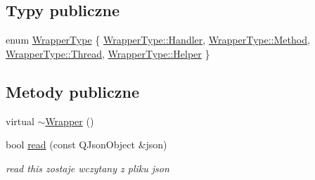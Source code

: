 \subsection*{Typy publiczne}
\begin{DoxyCompactItemize}
\item 
enum \hyperlink{class_d_adding_methods_1_1_wrapper_acb6db05ae66304ccd8b53c49221e0b09}{Wrapper\-Type} \{ \hyperlink{class_d_adding_methods_1_1_wrapper_acb6db05ae66304ccd8b53c49221e0b09a0bb4c52ba15ca41d65967d91840c66fb}{Wrapper\-Type\-::\-Handler}, 
\hyperlink{class_d_adding_methods_1_1_wrapper_acb6db05ae66304ccd8b53c49221e0b09a4c3880bb027f159e801041b1021e88e8}{Wrapper\-Type\-::\-Method}, 
\hyperlink{class_d_adding_methods_1_1_wrapper_acb6db05ae66304ccd8b53c49221e0b09ad97477d6d8a838ead9348185bb5b6742}{Wrapper\-Type\-::\-Thread}, 
\hyperlink{class_d_adding_methods_1_1_wrapper_acb6db05ae66304ccd8b53c49221e0b09aec34cd6f057c4737bfc8df7590ecb87e}{Wrapper\-Type\-::\-Helper}
 \}
\end{DoxyCompactItemize}
\subsection*{Metody publiczne}
\begin{DoxyCompactItemize}
\item 
virtual \hyperlink{class_d_adding_methods_1_1_wrapper_aa4f7725137a5389ee76db0bd8590243e}{$\sim$\-Wrapper} ()
\item 
bool \hyperlink{class_d_adding_methods_1_1_wrapper_ad8951e3aea612be776608e90eebca99b}{read} (const Q\-Json\-Object \&json)
\begin{DoxyCompactList}\small\item\em read this zostaje wczytany z pliku json \end{DoxyCompactList}\end{DoxyCompactItemize}
